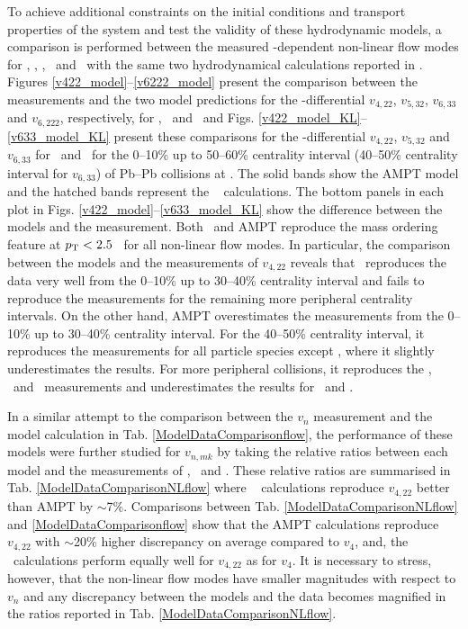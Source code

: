 To achieve additional constraints on the initial conditions and transport properties of the system and test the validity of these hydrodynamic models, a comparison is performed between the measured \pT-dependent non-linear flow modes for \pion, \kaon, \proton, \Ks~and \lambdas~with the same two hydrodynamical calculations reported in \cite{Zhao:2017yhj}. Figures \ref{v422_model}--\ref{v6222_model} present the comparison between the measurements and the two model predictions for the \pT-differential $v_{4,22}$, $v_{5,32}$, $v_{6,33}$ and $v_{6,222}$, respectively, for \pion, \kaon~and \proton~and Figs. \ref{v422_model_KL}--\ref{v633_model_KL} present these comparisons for the \pT-differential $v_{4,22}$, $v_{5,32}$ and $v_{6,33}$ for \Ks~and \lambdas~for the 0--10\% up to 50--60\% centrality interval (40--50\% centrality interval for $v_{6,33}$) of Pb--Pb collisions at \sNN. The solid bands show the AMPT model and the hatched bands represent the \trento~ calculations. The bottom panels in each plot in Figs. \ref{v422_model}--\ref{v633_model_KL} show the difference between the models and the measurement. Both \trento~and AMPT reproduce the mass ordering feature at $p_{\rm{T}}<2.5$ \GeV~for all non-linear flow modes. In particular, the comparison between the models and the measurements of $v_{4,22}$ reveals that \trento~reproduces the data very well from the 0--10\% up to 30--40\% centrality interval and fails to reproduce the measurements for the remaining more peripheral centrality intervals. On the other hand, AMPT overestimates the measurements from the 0--10\% up to 30--40\% centrality interval. For the 40--50\% centrality interval, it reproduces the measurements for all particle species except \pion, where it slightly underestimates the results. For more peripheral collisions, it reproduces the \kaon, \proton~and \lambdas~measurements and underestimates the results for \pion~and \Ks. 

In a similar attempt to the comparison between the $v_{n}$ measurement and the model calculation in Tab. \ref{ModelDataComparisonflow}, the performance of these models were further studied for $v_{n,mk}$ by taking the relative ratios between each model and the measurements of \pion, \kaon~and \proton. These relative ratios are summarised in Tab. \ref{ModelDataComparisonNLflow} where \trento~ calculations reproduce $v_{4,22}$ better than AMPT by $\sim$7\%. Comparisons between Tab. \ref{ModelDataComparisonNLflow} and \ref{ModelDataComparisonflow} show that the AMPT calculations reproduce $v_{4,22}$ with $\sim$20\% higher discrepancy on average compared to $v_{4}$, and, the \trento~calculations perform equally well for $v_{4,22}$ as for $v_{4}$. It is necessary to stress, however, that the non-linear flow modes have smaller magnitudes with respect to $v_{n}$ and any discrepancy between the models and the data becomes magnified in the ratios reported in Tab. \ref{ModelDataComparisonNLflow}. 

